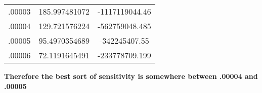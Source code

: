 \documentclass{article}
\begin{document}
\begin{enumerate}[label=\alph*]
\begin{center}
\begin{tabular}{ |c|c|c| }
            \\
            .00003 & 185.997481072  & -1117119044.46
            \\
            .00004 &129.721576224&-562759048.485
            \\
            .00005 & 95.4970354689 &-342245407.55
            \\
            .00006 &72.1191645491&-233778709.199
            \\
            \hline
            \end{tabular} 
    \end{center}
    \textbf{Therefore the best sort of sensitivity is somewhere between .00004 and .00005}
    

\end{enumerate}
\end{document}
